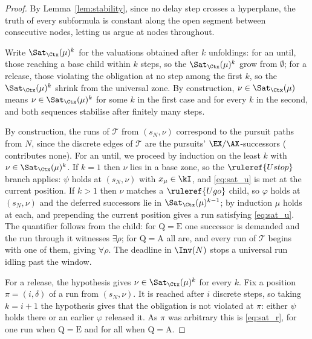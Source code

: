 \begin{proof}

By Lemma~\ref{lem:stability}, since no delay step crosses a hyperplane, the truth of every subformula is constant along the open segment between consecutive nodes, letting us argue at nodes throughout. 


Write $\Sat_{\Ctx}(\mu)^{k}$ for the valuations obtained after $k$ unfoldings: for an until, those reaching a
base child within $k$ steps, so the $\Sat_{\Ctx}(\mu)^{k}$ grow from $\emptyset$; for a release, those violating
the obligation at no step among the first $k$, so the $\Sat_{\Ctx}(\mu)^{k}$ shrink from the universal zone. By
construction, $\nu\in\Sat_{\Ctx}(\mu)$ means $\nu\in \Sat_{\Ctx}(\mu)^{k}$ for some $k$ in the first case and
for every $k$ in the second, and both sequences stabilise after finitely many steps.

\textit{} By construction, the runs of $\mathcal{T}$ from $(s_N,\nu)$ correspond to the pursuit paths from $N$,
since the discrete edges of $\mathcal{T}$ are the pursuits' $\EX/\AX$-successors ( contributes none).
\noindent
For an until, we proceed by induction on the least $k$ with $\nu\in \Sat_{\Ctx}(\mu)^{k}$. If $k=1$ then $\nu$ lies in a base
zone, so the $\ruleref{Ustop}$ branch applies: $\psi$ holds at $(s_N,\nu)$ with $x_\mu\in\kI$, and
\eqref{eq:sat_u} is met at the current position. If $k>1$ then $\nu$ matches a $\ruleref{Ugo}$
child, so $\varphi$ holds at $(s_N,\nu)$ and the deferred successors lie in $\Sat_{\Ctx}(\mu)^{k-1}$; by
induction $\mu$ holds at each, and prepending the current position gives a run satisfying
\eqref{eq:sat_u}. The quantifier follows from the child: for $\mathrm{Q}=\mathrm{E}$ one
successor is demanded and the run through it witnesses $\exists\rho$; for
$\mathrm{Q}=\mathrm{A}$ all are, and every run of $\mathcal{T}$ begins with one of them, giving
$\forall\rho$. The deadline in $\Inv(N)$ stops a universal run idling past the window.

\noindent
For a release, the hypothesis gives $\nu\in \Sat_{\Ctx}(\mu)^{k}$ for every $k$. Fix a position $\pi=(i,\delta)$ of a run from $(s_N,\nu)$. It is reached after $i$ discrete steps, so taking $k=i+1$ the hypothesis gives that the obligation is not violated at $\pi$:
either $\psi$ holds there or an earlier $\varphi$ released it. As $\pi$ was arbitrary this is \eqref{eq:sat_r}, for one run when
$\mathrm{Q}=\mathrm{E}$ and for all when $\mathrm{Q}=\mathrm{A}$.


\end{proof}
